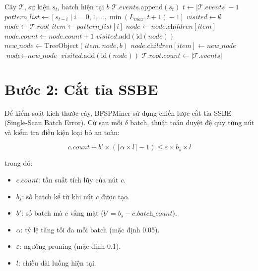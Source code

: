\documentclass[a4paper,12pt]{report}
\begin{document}
\begin{algorithm}[H]
\caption{Thêm sự kiện vào cây Inverted $T_0$}
\label{alg:add_event}
\begin{algorithmic}[1]
\REQUIRE Cây $\mathcal{T}$, sự kiện $s_t$, batch hiện tại $b$
\STATE $\mathcal{T}.\textit{events}.\text{append}(s_t)$
\STATE $t \leftarrow |\mathcal{T}.\textit{events}| - 1$
\STATE $\textit{pattern\_list} \leftarrow [s_{t-i} \mid i = 0, 1, \dots, \min(L_{max}, t+1) - 1]$
\STATE $\textit{visited} \leftarrow \emptyset$ 
\STATE $\textit{node} \leftarrow \mathcal{T}.\textit{root}$
    \STATE $\textit{item} \leftarrow \textit{pattern\_list}[i]$
        \STATE $\textit{node} \leftarrow \textit{node}.\textit{children}[\textit{item}]$
            \STATE $\textit{node}.\textit{count} \leftarrow \textit{node}.\textit{count} + 1$
            \STATE $\textit{visited}.\text{add}(\text{id}(\textit{node}))$
        \ENDIF
    \ELSE
        \STATE $\textit{new\_node} \leftarrow \text{TreeObject}(\textit{item}, \textit{node}, b)$
        \STATE $\textit{node}.\textit{children}[\textit{item}] \leftarrow \textit{new\_node}$
        \STATE $\textit{node} \leftarrow \textit{new\_node}$
        \STATE $\textit{visited}.\text{add}(\text{id}(\textit{node}))$
    \ENDIF
\ENDFOR
\STATE $\mathcal{T}.\textit{root}.\textit{count} \leftarrow |\mathcal{T}.\textit{events}|$
\end{algorithmic}
\end{algorithm}

\section{Bước 2: Cắt tỉa SSBE}
\label{sec:ssbe}

Để kiểm soát kích thước cây, BFSPMiner sử dụng chiến lược cắt tỉa SSBE (Single-Scan Batch Error). Cứ sau mỗi $\delta$ batch, thuật toán duyệt đệ quy từng nút và kiểm tra điều kiện loại bỏ an toàn:

\begin{equation}
    c.\textit{count} + b' \times (\lceil \alpha \times l \rceil - 1) \leq \varepsilon \times b_s \times l
\end{equation}

trong đó:
\begin{itemize}
    \item $c.\textit{count}$: tần suất tích lũy của nút $c$.
    \item $b_s$: số batch kể từ khi nút $c$ được tạo.
    \item $b'$: số batch mà $c$ vắng mặt ($b' = b_s - c.\textit{batch\_count}$).
    \item $\alpha$: tỷ lệ tăng tối đa mỗi batch (mặc định 0.05).
    \item $\varepsilon$: ngưỡng pruning (mặc định 0.1).
    \item $l$: chiều dài luồng hiện tại.
\end{itemize}
\end{document}
